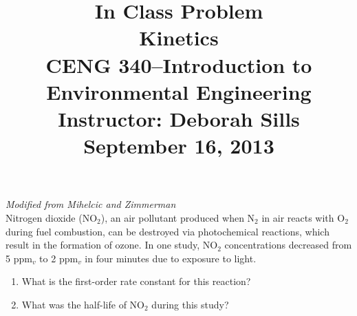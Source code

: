 \documentclass[12pt,letterpaper]{article}
\begin{document}
\setlength{\parindent}{0cm} 


\frenchspacing






\title {\large{In Class Problem} \\ 
{\large \textbf{Kinetics}\\CENG 340--Introduction to Environmental Engineering\\
Instructor: Deborah Sills\\September 16, 2013}}

\author{}

\date {}
\maketitle

\vspace{-0.8in}



\emph {Modified from Mihelcic and Zimmerman}\\

Nitrogen dioxide (NO$_2$), an air pollutant produced when N$_2$ in air reacts with O$_2$ during fuel combustion, can be destroyed via photochemical reactions, which result in the formation of ozone.  In one study, NO$_2$  concentrations decreased from 5 ppm$_v$ to 2 ppm$_v$ in four minutes due to exposure to light.  

\begin{enumerate}
\item What is the first-order rate constant for this reaction?
\vspace{3in}
\item What was the half-life of NO$_2$ during this study?
\end{enumerate}
\end{document}
